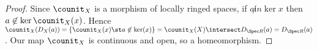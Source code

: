 \begin{proof}
Since $\counit_X$ is a morphism of locally ringed spaces, if $a\not in \ker{x}$ then $a\not \in \ker{\counit_X(x)}$.
Hence
$\counit_X(D_X(a))= \{\counit_X(x) \st a\not\in \ker(x)\} = \counit_X(X) \intersect D_{\Spec R}(a) = D_{\Spec R}(a)$.
Our map $\counit_X$ is continuous and open, so a homeomorphism.
\end{proof}